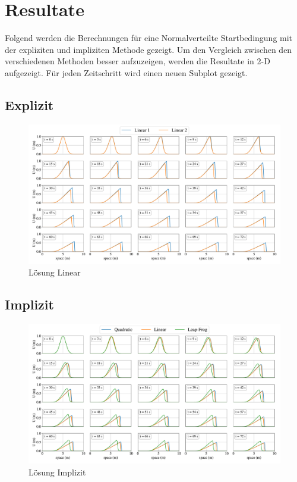 %
%
\section{Resultate
\label{burgers:section:results}}

	Folgend werden die Berechnungen f\"ur eine Normalverteilte Startbedingung mit der expliziten und impliziten Methode gezeigt.
	Um den Vergleich zwischen den verschiedenen Methoden besser aufzuzeigen, werden die Resultate in 2-D aufgezeigt.
	F\"ur jeden Zeitschritt wird einen neuen Subplot gezeigt.
	
	\subsection{Explizit}

    \begin{figure}
	\centering
	\includegraphics[width=1\textwidth]{papers/burgers/BurgersEquation/lin_paper.pdf}
	\caption{L\"osung Linear}
	\label{burgers:fig:lin}
	\end{figure}
	
	\subsection{Implizit}

    \begin{figure}
	\centering
	\includegraphics[width=1\textwidth]{papers/burgers/BurgersEquation/imp_paper.pdf}
	\caption{L\"osung Implizit}
	\label{burgers:fig:imp}
	\end{figure}
